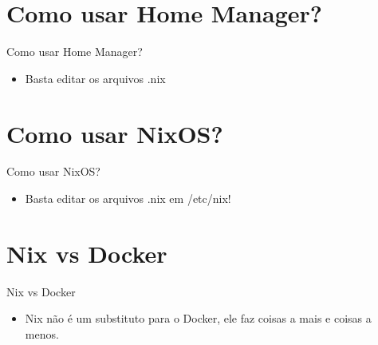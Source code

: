 \documentclass[presentation]{beamer}
\begin{document}
\section{Como usar Home Manager?}
\label{sec:orgc4270f1}

\begin{frame}[label={sec:org66bd9c8}]{Como usar Home Manager?}
\begin{itemize}
\item Basta editar os arquivos .nix
\end{itemize}
\end{frame}

\section{Como usar NixOS?}
\label{sec:org6070528}

\begin{frame}[label={sec:orgdaacce4}]{Como usar NixOS?}
\begin{itemize}
\item Basta editar os arquivos .nix em /etc/nix!
\end{itemize}
\end{frame}

\section{Nix vs Docker}
\label{sec:org41c430c}
\begin{frame}[label={sec:orgafd8edf}]{Nix vs Docker}
\begin{itemize}
\item Nix não é um substituto para o Docker, ele faz coisas a mais e coisas a menos.
\end{itemize}
\end{frame}
\end{document}
